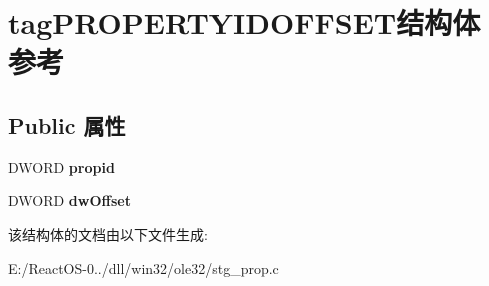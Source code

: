 \hypertarget{structtag_p_r_o_p_e_r_t_y_i_d_o_f_f_s_e_t}{}\section{tag\+P\+R\+O\+P\+E\+R\+T\+Y\+I\+D\+O\+F\+F\+S\+E\+T结构体 参考}
\label{structtag_p_r_o_p_e_r_t_y_i_d_o_f_f_s_e_t}
\subsection*{Public 属性}
\begin{DoxyCompactItemize}
\item 
\mbox{\label{structtag_p_r_o_p_e_r_t_y_i_d_o_f_f_s_e_t_aa5052da2b1b366eaff3ef3537acbd5de}} 
D\+W\+O\+RD {\bfseries propid}
\item 
\mbox{\label{structtag_p_r_o_p_e_r_t_y_i_d_o_f_f_s_e_t_a91f9d0b687d827e628724ffebaca1ba1}} 
D\+W\+O\+RD {\bfseries dw\+Offset}
\end{DoxyCompactItemize}


该结构体的文档由以下文件生成\+:\begin{DoxyCompactItemize}
\item 
E\+:/\+React\+O\+S-\/0../dll/win32/ole32/stg\+\_\+prop.\+c\end{DoxyCompactItemize}
